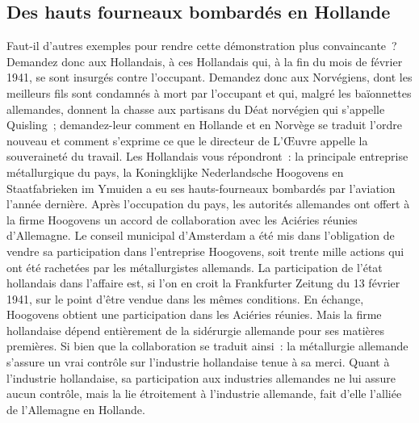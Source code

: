 \documentclass[french,twoside]{book} %
\begin{document}
\subsection[Des hauts fourneaux bombardés en Hollande]{Des hauts fourneaux bombardés en Hollande}
\noindent Faut-il d’autres exemples pour rendre cette démonstration plus convaincante ? Demandez donc aux Hollandais, à ces Hollandais qui, à la fin du mois de février 1941, se sont insurgés contre l’occupant. Demandez donc aux Norvégiens, dont les meilleurs fils sont condamnés à mort par l’occupant et qui, malgré les baïonnettes allemandes, donnent la chasse aux partisans du Déat norvégien qui s’appelle Quisling ; demandez-leur comment en Hollande et en Norvège se traduit l’ordre nouveau et comment s’exprime ce que le directeur de L’Œuvre appelle la souveraineté du travail. Les Hollandais vous répondront : la principale entreprise métallurgique du pays, la Koningklijke Nederlandsche Hoogovens en Staatfabrieken im Ymuiden a eu ses hauts-fourneaux bombardés par l’aviation l’année dernière. Après l’occupation du pays, les autorités allemandes ont offert à la firme Hoogovens un accord de collaboration avec les Aciéries réunies d’Allemagne. Le conseil municipal d’Amsterdam a été mis dans l’obligation de vendre sa participation dans l’entreprise Hoogovens, soit trente mille actions qui ont été rachetées par les métallurgistes allemands. La participation de l’état hollandais dans l’affaire est, si l’on en croit la Frankfurter Zeitung du 13 février 1941, sur le point d’être vendue dans les mêmes conditions. En échange, Hoogovens obtient une participation dans les Aciéries réunies. Mais la firme hollandaise dépend entièrement de la sidérurgie allemande pour ses matières premières. Si bien que la collaboration se traduit ainsi : la métallurgie allemande s’assure un vrai contrôle sur l’industrie hollandaise tenue à sa merci. Quant à l’industrie hollandaise, sa participation aux industries allemandes ne lui assure aucun contrôle, mais la lie étroitement à l’industrie allemande, fait d’elle l’alliée de l’Allemagne en Hollande.
\end{document}
